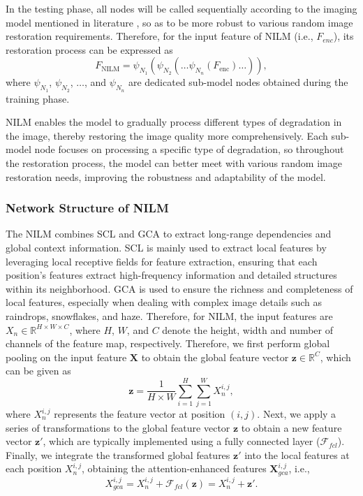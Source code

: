 \documentclass[final,12pt]{elsarticle}
\begin{document}
    In the testing phase, all nodes will be called sequentially according to the imaging model mentioned in literature \citep{guo2024onerestore}, so as to be more robust to various random image restoration requirements. Therefore, for the input feature of NILM (i.e., $F_{enc}$), its restoration process can be expressed as
    \begin{equation}
         F_{\text{NILM}}=\psi_{N_1}\left(\psi_{N_2}\left(\ldots \psi_{N_n}(F_{\text{enc}}) \ldots\right)\right),
    \end{equation}
    where $\psi_{N_1}$, $\psi_{N_2}$, $\ldots$, and $\psi_{N_n}$ are dedicated sub-model nodes obtained during the training phase. 

    NILM enables the model to gradually process different types of degradation in the image, thereby restoring the image quality more comprehensively. Each sub-model node focuses on processing a specific type of degradation, so throughout the restoration process, the model can better meet with various random image restoration needs, improving the robustness and adaptability of the model.
%
\subsubsection{Network Structure of NILM}
%
    The NILM combines SCL and GCA to extract long-range dependencies and global context information. SCL is mainly used to extract local features by leveraging local receptive fields for feature extraction, ensuring that each position’s features extract high-frequency information and detailed structures within its neighborhood. GCA is used to ensure the richness and completeness of local features, especially when dealing with complex image details such as raindrops, snowflakes, and haze. Therefore, for NILM, the input features are $X_n \in \mathbb{R}^{H \times W \times C}$, where $H$, $W$, and $C$ denote the height, width and number of channels of the feature map, respectively. Therefore, we first perform global pooling on the input feature $\mathbf{X}$ to obtain the global feature vector $\mathbf{z} \in \mathbb{R}^{C}$, which can be given as
    \begin{equation}   
        \mathbf{z} = \frac{1}{H \times W} \sum_{i=1}^{H} \sum_{j=1}^{W} X_n^{i,j},
    \end{equation}   
   where $X_n^{i,j}$ represents the feature vector at position $(i, j)$. Next, we apply a series of transformations to the global feature vector $\mathbf{z}$ to obtain a new feature vector $\mathbf{z}'$, which are typically implemented using a fully connected layer ($\mathcal{F}_{fcl}$). Finally, we integrate the transformed global features $\mathbf{z}'$ into the local features at each position $X_n^{i,j}$, obtaining the attention-enhanced features $\mathbf{X}_{gca}^{i,j}$, i.e.,
    \begin{equation}  
        X_{gca}^{i,j} = X_n^{i,j} + \mathcal{F}_{fcl}(\mathbf{z}) = X_n^{i,j} + \mathbf{z}'.
    \end{equation}   
\end{document}
